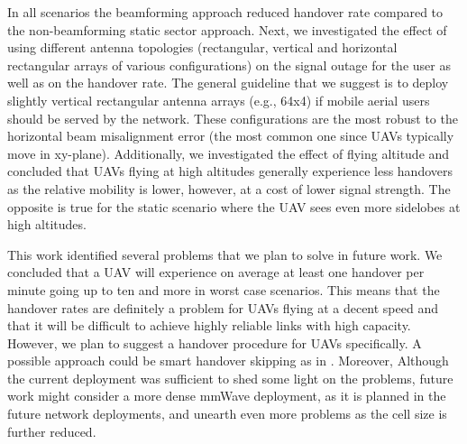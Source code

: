 \documentclass[conference,twocolumn]{IEEEtran}
\newcommand{\sofie}[1]{{\color{red}[sp: #1]}}
\begin{document}
In all scenarios the beamforming approach reduced handover rate compared to the non-beamforming static sector approach. Next, we investigated the effect of using different antenna topologies (rectangular, vertical and horizontal rectangular arrays of various configurations) on the signal outage for the user as well as on the handover rate. 
The general guideline that we suggest is to deploy slightly vertical rectangular antenna arrays (e.g., 64x4) if mobile aerial users should be served by the network.
These configurations are the most robust to the horizontal beam misalignment error (the most common one since UAVs typically move in xy-plane).
Additionally, we investigated the effect of flying altitude and concluded that UAVs flying at high altitudes generally experience less handovers as the relative mobility is lower, however, at a cost of lower signal strength. The opposite is true for the static scenario where the UAV sees even more sidelobes at high altitudes.
\par
This work identified several problems that we plan to solve in future work.
We concluded that a UAV will experience on average at least one handover per minute going up to ten and more in worst case scenarios.
This means that the handover rates are definitely a problem for UAVs flying at a decent speed and that it will be difficult to achieve highly reliable links with high capacity.
However, we plan to suggest a handover procedure for UAVs specifically.
A possible approach could be smart handover skipping as in \cite{Arshad2016}.
Moreover, Although the current deployment was sufficient to shed some light on the problems, future work might consider a more dense mmWave deployment, as it is planned in the future network deployments, and unearth even more problems as the cell size is further reduced.

{}

\vspace{12pt}
\end{document}
